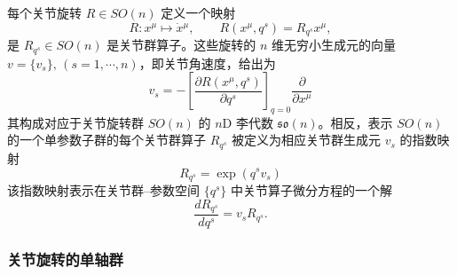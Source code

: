 \documentclass[11pt,fontset=founder]{ctexart}
\begin{document}
每个关节旋转 $R\in SO(n)$ 定义一个映射
\begin{equation*}
R:x^{\mu }\mapsto \dot{x}{}^{\mu }, \qquad R(x^{\mu },q^{s})=R_{q^{s}}x^{\mu
},
\end{equation*}
是 $R_{q^{s}}\in SO(n)$ 是关节群算子。这些旋转的 $n$ 维无穷小生成元的向量 $v=\{v_{s}\},\,(s=1,\cdots ,n)$，即关节角速度，给出为
\begin{equation*}
v_{s}=-\left[\frac{\partial R(x^{\mu },q^{s})}{\partial q^{s}}\right]_{q=0}%
\frac{\partial }{\partial x^{\mu }}
\end{equation*}
其构成对应于关节旋转群 $SO(n)$ 的 $n$D 李代数 $\mathfrak{so}(n)$。相反，表示 $SO(n)$ 的一个单参数子群的每个关节群算子 $R_{q^{s}}$ 被定义为相应关节群生成元 $v_{s}$ 的指数映射
\begin{equation*}
R_{q^{s}}=\exp (q^{s}v_{s})
\end{equation*}
该指数映射表示在关节群–参数空间 $\{q^{s}\}$ 中关节算子微分方程的一个解
\begin{equation*}
\frac{dR_{q^{s}}}{dq^{s}}=v_{s}R_{q^{s}}.
\end{equation*}

\subsubsection{关节旋转的单轴群}
\end{document}
